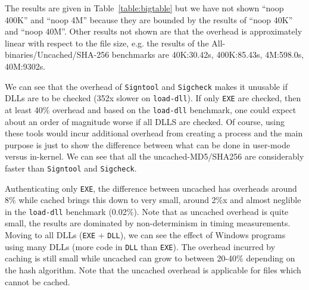 The results are given in Table~\ref{table:bigtable} but
we have not shown ``noop 400K'' and ``noop 4M'' 
because they are bounded by the results of ``noop 40K'' and ``noop 40M''.
Other results not shown are that the overhead is approximately
linear with respect to the file size, e.g.
the results of the All-binaries/Uncached/SHA-256 benchmarks are
40K:30.42s, 400K:85.43s, 4M:598.0s, 40M:9302s.

We can see that the overhead of {\tt Signtool} and {\tt Sigcheck} makes
it unusable if DLLs are to be checked (352x slower on {\tt load-dll}).
If only {\tt EXE} are checked, then at least 40\% overhead and based
on the {\tt load-dll} benchmark, one could expect about an order
of magnitude worse if all DLLS are checked.
Of course, using these tools would incur additional overhead from creating
a process and the main purpose is just to show the difference
between what can be done in user-mode versus in-kernel.
We can see that all the uncached-MD5/SHA256 are considerably faster
than {\tt Signtool} and {\tt Sigcheck}.

Authenticating only {\tt EXE}, the difference between uncached has overheads
around 8\% while cached brings this down to very small, around 2\%x and almost
neglible in the {\tt load-dll} benchmark (0.02\%).
Note that as uncached overhead is quite small, the results are dominated
by non-determinism in timing measurements.
Moving to all DLLs ({\tt EXE} + {\tt DLL}), we can see the effect of Windows
programs using many DLLs (more code in {\tt DLL} than {\tt EXE}).
The overhead incurred by caching is still small while uncached can grow 
to between 20-40\% depending on the hash algorithm.
Note that the uncached overhead is applicable for files which cannot be cached.



